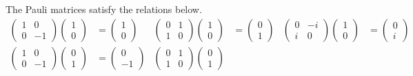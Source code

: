 \begin{answer}
	The Pauli matrices satisfy the relations below.
	\begin{align*}
		\begin{pmatrix}
			1 & 0  \\
			0 & -1
		\end{pmatrix}
		\begin{pmatrix}
			1 \\ 0
		\end{pmatrix}
		 & =
		\begin{pmatrix}
			1 \\ 0
		\end{pmatrix}
		 &
		\begin{pmatrix}
			0 & 1 \\
			1 & 0
		\end{pmatrix}
		\begin{pmatrix}
			1 \\ 0
		\end{pmatrix}
		 & =
		\begin{pmatrix}
			0 \\ 1
		\end{pmatrix}
		 &
		\begin{pmatrix}
			0 & -i \\
			i & 0
		\end{pmatrix}
		\begin{pmatrix}
			1 \\ 0
		\end{pmatrix}
		 & =
		\begin{pmatrix}
			0 \\ i
		\end{pmatrix}
		\\
		\begin{pmatrix}
			1 & 0  \\
			0 & -1
		\end{pmatrix}
		\begin{pmatrix}
			0 \\ 1
		\end{pmatrix}
		 & =
		\begin{pmatrix}
			0 \\ -1
		\end{pmatrix}
		 &
		\begin{pmatrix}
			0 & 1 \\
			1 & 0
		\end{pmatrix}
		\begin{pmatrix}
			0 \\ 1
		\end{pmatrix}

\end{align*}
\end{answer}
